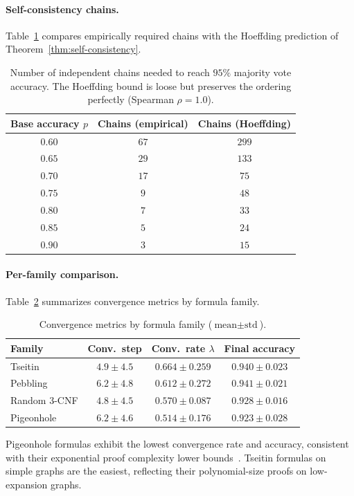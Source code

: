 \paragraph{Self-consistency chains.}
Table~\ref{tab:chains} compares empirically required chains with the Hoeffding
prediction of Theorem~\ref{thm:self-consistency}.

\begin{table}[ht]
\centering
\caption{Number of independent chains needed to reach $95\%$ majority vote
accuracy.  The Hoeffding bound is loose but preserves the ordering perfectly
(Spearman $\rho = 1.0$).}\label{tab:chains}
\begin{tabular}{@{}ccc@{}}
\toprule
\textbf{Base accuracy $p$} & \textbf{Chains (empirical)}
  & \textbf{Chains (Hoeffding)} \\
\midrule
$0.60$ & $67$ & $299$ \\
$0.65$ & $29$ & $133$ \\
$0.70$ & $17$ & $75$ \\
$0.75$ & $9$ & $48$ \\
$0.80$ & $7$ & $33$ \\
$0.85$ & $5$ & $24$ \\
$0.90$ & $3$ & $15$ \\
\bottomrule
\end{tabular}
\end{table}

\paragraph{Per-family comparison.}
Table~\ref{tab:families} summarizes convergence metrics by formula family.

\begin{table}[ht]
\centering
\caption{Convergence metrics by formula family ($\text{mean} \pm
\text{std}$).}\label{tab:families}
\begin{tabular}{@{}lccc@{}}
\toprule
\textbf{Family} & \textbf{Conv.\ step} & \textbf{Conv.\ rate $\lambda$}
  & \textbf{Final accuracy} \\
\midrule
Tseitin & $4.9 \pm 4.5$ & $0.664 \pm 0.259$ & $0.940 \pm 0.023$ \\
Pebbling & $6.2 \pm 4.8$ & $0.612 \pm 0.272$ & $0.941 \pm 0.021$ \\
Random 3-CNF & $4.8 \pm 4.5$ & $0.570 \pm 0.087$ & $0.928 \pm 0.016$ \\
Pigeonhole & $6.2 \pm 4.6$ & $0.514 \pm 0.176$ & $0.923 \pm 0.028$ \\
\bottomrule
\end{tabular}
\end{table}

Pigeonhole formulas exhibit the lowest convergence rate and accuracy,
consistent with their exponential proof complexity lower
bounds~\cite{haken1985intractability}.  Tseitin formulas on simple graphs are
the easiest, reflecting their polynomial-size proofs on low-expansion graphs.
